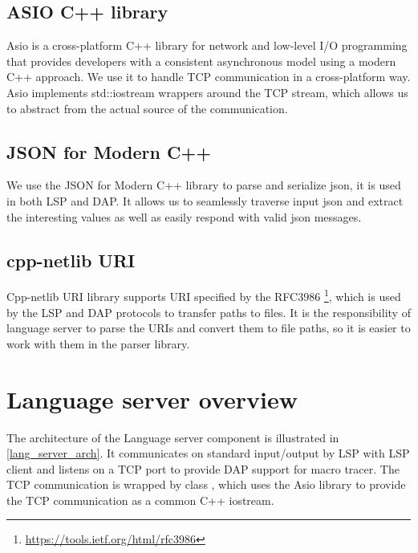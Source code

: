 \subsection{ASIO C++ library}
Asio is a cross-platform C++ library for network and low-level I/O programming that provides developers with a consistent asynchronous model using a modern C++ approach. We use it to handle TCP communication in a cross-platform way. Asio implements std::iostream wrappers around the TCP stream, which allows us to abstract from the actual source of the communication.

\subsection{JSON for Modern C++}
We use the JSON for Modern C++ library to parse and serialize json, it is used in both LSP and DAP. It allows us to seamlessly traverse input json and extract the interesting values as well as easily respond with valid json messages.

\subsection{cpp-netlib URI}
Cpp-netlib URI library supports URI specified by the RFC3986 \footnote{\url{https://tools.ietf.org/html/rfc3986}}, which is used by the LSP and DAP protocols to transfer paths to files. It is the responsibility of language server to parse the URIs and convert them to file paths, so it is easier to work with them in the parser library. 

\section{Language server overview}
The architecture of the Language server component is illustrated in \cref{lang_server_arch}. It communicates on standard input/output by LSP with LSP client and listens on a TCP port to provide DAP support for macro tracer. The TCP communication is wrapped by class , which uses the Asio library to provide the TCP communication as a common C++ iostream.


